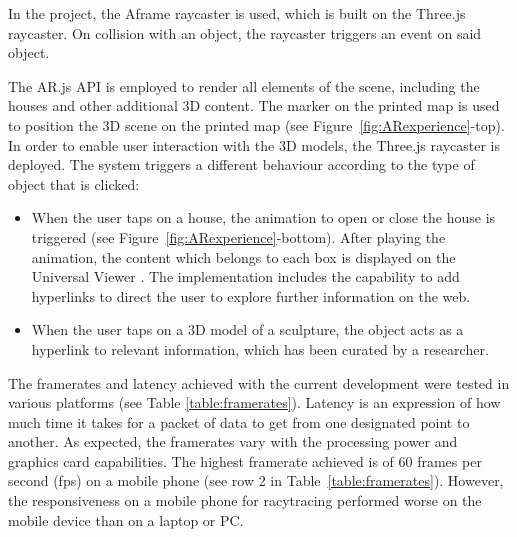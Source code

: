 \documentclass[acmlarge,screen,dvipsnames]{acmart}
\begin{document}
In the project, the Aframe raycaster is used, which is built
on the Three.js raycaster. On collision with an object, the raycaster triggers
an event on said object. 

The AR.js API is employed to render all elements of the scene, including the
houses and other additional 3D content. The marker on the printed map is used
to position the 3D scene on the printed map (see
Figure~\ref{fig:ARexperience}-top). In order to enable user interaction with
the 3D models, the Three.js raycaster is deployed. The system triggers a different
behaviour according to the type of object that is clicked: 

\begin{itemize}
\item When the user taps on a house, the animation to open or close the house
is triggered (see Figure~\ref{fig:ARexperience}-bottom). After playing the
animation, the content which belongs to each box is displayed on the Universal
Viewer \cite{uv}. The implementation includes the capability to add hyperlinks
to direct the user to explore further information on the web. 
\item When the
user taps on a 3D model of a sculpture, the object acts as a hyperlink to
relevant information, which has been curated by a researcher.  
\end{itemize}


The framerates and latency achieved with the current development were tested
in various platforms (see Table \ref{table:framerates}). Latency is an
expression of how much time it takes for a packet of data to get from one
designated point to another. As expected, the framerates vary with the
processing power and graphics card capabilities. The highest framerate
achieved is of 60 frames per second (fps) on a mobile phone (see row 2 in
Table~\ref{table:framerates}). However, the responsiveness on a mobile phone for
racytracing performed worse on the mobile device than on a laptop or PC.
\end{document}
